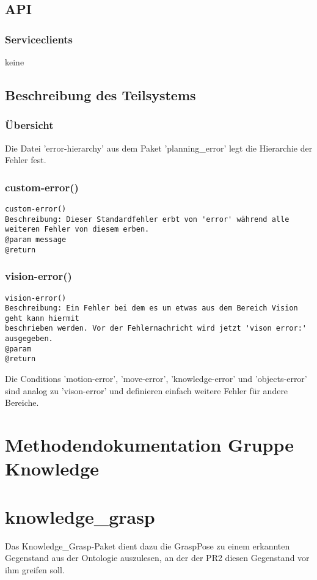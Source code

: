 \documentclass{suturo}
\begin{document}
\subsection{API}
\subsubsection{Serviceclients}
keine
\subsection{Beschreibung des Teilsystems}
\subsubsection{\"Ubersicht}
Die Datei 'error-hierarchy' aus dem Paket 'planning\_error' legt die Hierarchie der Fehler fest.

\subsubsection{custom-error()}
\begin{verbatim}
custom-error()
Beschreibung: Dieser Standardfehler erbt von 'error' während alle weiteren Fehler von diesem erben. 
@param message
@return 
\end{verbatim}

\subsubsection{vision-error()}
\begin{verbatim}
vision-error()
Beschreibung: Ein Fehler bei dem es um etwas aus dem Bereich Vision geht kann hiermit
beschrieben werden. Vor der Fehlernachricht wird jetzt 'vison error:' ausgegeben. 
@param
@return 
\end{verbatim}

Die Conditions 'motion-error', 'move-error', 'knowledge-error' und 'objects-error' sind analog zu 'vison-error' und definieren einfach weitere Fehler für andere Bereiche.


\newpage
\section*{Methodendokumentation Gruppe Knowledge}
\section{knowledge\_grasp}
Das Knowledge\_Grasp-Paket dient dazu die GraspPose zu einem erkannten Gegenstand aus der Ontologie auszulesen, an der der PR2 diesen Gegenstand vor ihm greifen soll.
\end{document}
